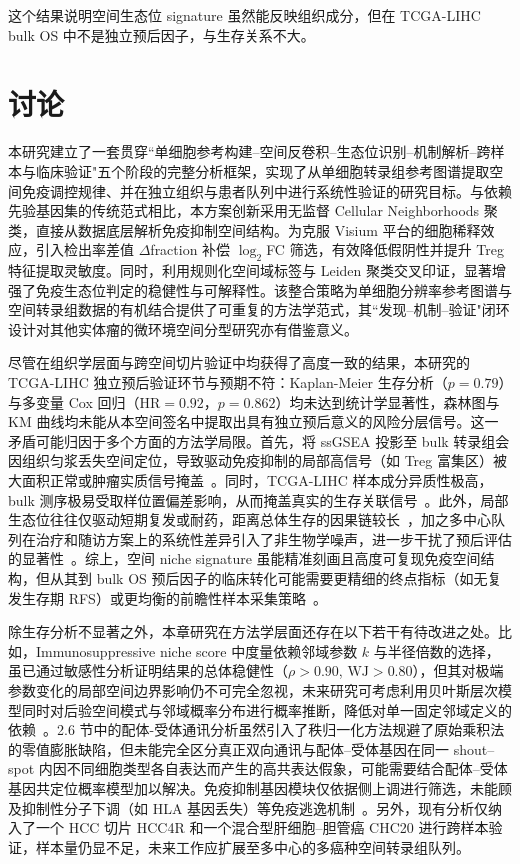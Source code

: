 \documentclass[12pt, a4paper]{ctexart}
\begin{document}
这个结果说明空间生态位 signature 虽然能反映组织成分，但在 TCGA-LIHC bulk OS 中不是独立预后因子，与生存关系不大。

\section{讨论}

本研究建立了一套贯穿``单细胞参考构建--空间反卷积--生态位识别--机制解析--跨样本与临床验证"五个阶段的完整分析框架，实现了从单细胞转录组参考图谱提取空间免疫调控规律、并在独立组织与患者队列中进行系统性验证的研究目标。与依赖先验基因集的传统范式相比，本方案创新采用无监督 Cellular Neighborhoods 聚类，直接从数据底层解析免疫抑制空间结构。为克服 Visium 平台的细胞稀释效应，引入检出率差值 $\Delta$fraction 补偿 $\log_2$FC 筛选，有效降低假阴性并提升 Treg 特征提取灵敏度。同时，利用规则化空间域标签与 Leiden 聚类交叉印证，显著增强了免疫生态位判定的稳健性与可解释性。该整合策略为单细胞分辨率参考图谱与空间转录组数据的有机结合提供了可重复的方法学范式，其``发现--机制--验证"闭环设计对其他实体瘤的微环境空间分型研究亦有借鉴意义。

尽管在组织学层面与跨空间切片验证中均获得了高度一致的结果，本研究的 TCGA-LIHC 独立预后验证环节与预期不符：Kaplan-Meier 生存分析（$p = 0.79$）与多变量 Cox 回归（$\text{HR} = 0.92$，$p = 0.862$）均未达到统计学显著性，森林图与 KM 曲线均未能从本空间签名中提取出具有独立预后意义的风险分层信号。这一矛盾可能归因于多个方面的方法学局限。首先，将 ssGSEA 投影至 bulk 转录组会因组织匀浆丢失空间定位，导致驱动免疫抑制的局部高信号（如 Treg 富集区）被大面积正常或肿瘤实质信号掩盖~\citep{svensson2018spatiallyvariable,gao2020loss}。同时，TCGA-LIHC 样本成分异质性极高，bulk 测序极易受取样位置偏差影响，从而掩盖真实的生存关联信号~\citep{zhang2019landscape}。此外，局部生态位往往仅驱动短期复发或耐药，距离总体生存的因果链较长~\citep{zhang2019landscape}，加之多中心队列在治疗和随访方案上的系统性差异引入了非生物学噪声，进一步干扰了预后评估的显著性~\citep{liu2018tcga}。综上，空间 niche signature 虽能精准刻画且高度可复现免疫空间结构，但从其到 bulk OS 预后因子的临床转化可能需要更精细的终点指标（如无复发生存期 RFS）或更均衡的前瞻性样本采集策略~\citep{liu2018tcga}。

除生存分析不显著之外，本章研究在方法学层面还存在以下若干有待改进之处。比如，Immunosuppressive niche score 中度量依赖邻域参数 $k$ 与半径倍数的选择，虽已通过敏感性分析证明结果的总体稳健性（$\rho > 0.90$, $\text{WJ} > 0.80$），但其对极端参数变化的局部空间边界影响仍不可完全忽视，未来研究可考虑利用贝叶斯层次模型同时对后验空间模式与邻域概率分布进行概率推断，降低对单一固定邻域定义的依赖~\citep{kleshchevnikov2022cell2location}。2.6 节中的配体-受体通讯分析虽然引入了秩归一化方法规避了原始乘积法的零值膨胀缺陷，但未能完全区分真正双向通讯与配体--受体基因在同一 shout--spot 内因不同细胞类型各自表达而产生的高共表达假象，可能需要结合配体--受体基因共定位概率模型加以解决。免疫抑制基因模块仅依据侧上调进行筛选，未能顾及抑制性分子下调（如 HLA 基因丢失）等免疫逃逸机制~\citep{montesion2021hla}。另外，现有分析仅纳入了一个 HCC 切片 HCC4R 和一个混合型肝细胞--胆管癌 CHC20 进行跨样本验证，样本量仍显不足，未来工作应扩展至多中心的多癌种空间转录组队列。
\end{document}
